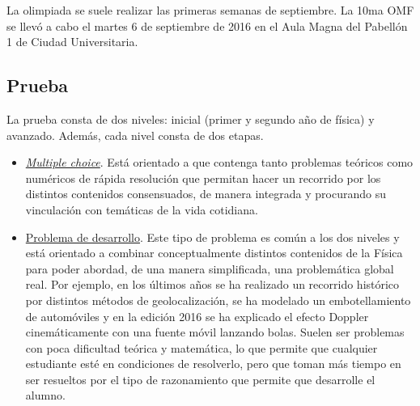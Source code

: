 \documentclass[a0paper,portrait,final,fontscale=0.302]{baposter}
\begin{document}
\begin{poster}
{  La olimpiada se suele realizar las primeras semanas de
  septiembre. La 10ma OMF se llevó a cabo el martes 6 de septiembre de
  2016 en el Aula Magna del Pabellón 1 de Ciudad Universitaria.

  \vspace{-0.2cm}
  \subsection*{Prueba}  \vspace{-0.2cm}
  La prueba consta de dos niveles: inicial (primer y segundo año de
  física) y avanzado. Además, cada nivel consta de dos etapas.
  \begin{itemize}[wide, labelwidth=!, labelindent=0pt]\setlength\itemsep{0em} \vspace{-0.2cm}
  \item \underline{\it Multiple choice}. Está orientado a que contenga
    tanto problemas teóricos como numéricos de rápida resolución que
    permitan hacer un recorrido por los distintos contenidos
    consensuados, de manera integrada y procurando su vinculación con
    temáticas de la vida cotidiana.
  \item \underline{Problema de desarrollo}. Este tipo de problema es
    común a los dos niveles y está orientado a combinar
    conceptualmente distintos contenidos de la Física para poder
    abordad, de una manera simplificada, una problemática global
    real. Por ejemplo, en los últimos años se ha realizado un
    recorrido histórico por distintos métodos de geolocalización, se
    ha modelado un embotellamiento de automóviles y en la edición 2016
    se ha explicado el efecto Doppler cinemáticamente con una fuente
    móvil lanzando bolas. Suelen ser problemas con poca dificultad
    teórica y matemática, lo que permite que cualquier estudiante esté
    en condiciones de resolverlo, pero que toman más tiempo en ser
    resueltos por el tipo de razonamiento que permite que desarrolle
    el alumno.
  \end{itemize}
  
}

\end{poster}
\end{document}
